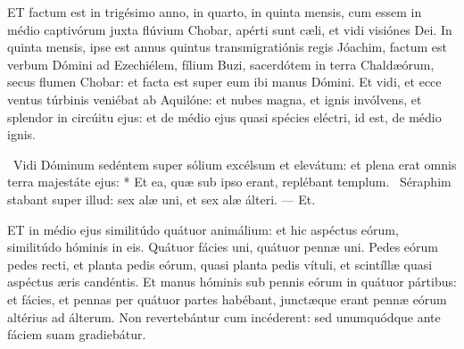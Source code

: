 




\lettrine[lines=2]{E}{T} factum est in trigésimo anno, in quarto, in quinta mensis, cum essem in médio captivórum juxta flúvium Chobar, apérti sunt cæli, et vidi visiónes Dei. In quinta mensis, ipse est annus quintus transmigratiónis regis Jóachim, factum est verbum Dómini ad Ezechiélem, fílium Buzi, sacerdótem in terra Chaldæórum, secus flumen Chobar: et facta est super eum ibi manus Dómini. Et vidi, et ecce ventus túrbinis veniébat ab Aquilóne: et nubes magna, et ignis invólvens, et splendor in circúitu ejus: et de médio ejus quasi spécies eléctri, id est, de médio ignis.

\R\ Vidi Dóminum sedéntem super sólium excélsum et elevátum: et plena erat omnis terra majestáte ejus: * Et ea, quæ sub ipso erant, replébant templum. \V\ Séraphim stabant super illud: sex alæ uni, et sex alæ álteri. — Et.


\lettrine[lines=2]{E}{T} in médio ejus similitúdo quátuor animálium: et hic aspéctus eórum, similitúdo hóminis in eis. Quátuor fácies uni, quátuor pennæ uni. Pedes eórum pedes recti, et planta pedis eórum, quasi planta pedis vítuli, et scintíllæ quasi aspéctus æris candéntis. Et manus hóminis sub pennis eórum in quátuor pártibus: et fácies, et pennas per quátuor partes habébant, junctæque erant pennæ eórum altérius ad álterum. Non revertebántur cum incéderent: sed unumquódque ante fáciem suam gradiebátur.

